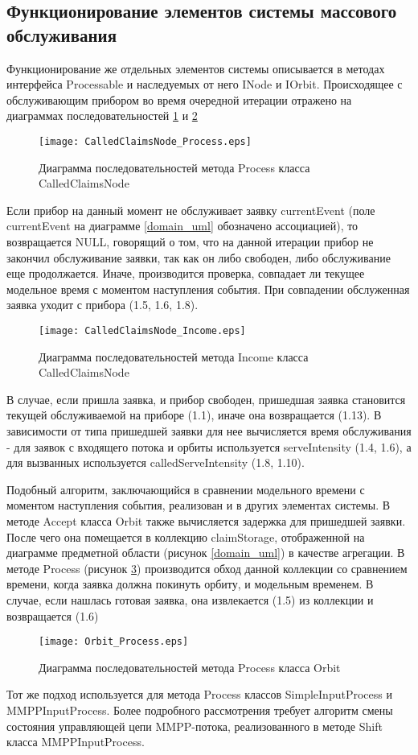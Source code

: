 \subsection{Функционирование элементов системы массового обслуживания}
Функционирование же отдельных элементов системы описывается в методах интерфейса Processable и наследуемых от него INode и IOrbit.
Происходящее с обслуживающим прибором во время очередной итерации отражено на диаграммах последовательностей \ref{CalledClaimsNode_Process_uml} и \ref{CalledClaimsNode_Income_uml}
\begin{figure}[H]
	\centering
	\texttt{[image: CalledClaimsNode\_Process.eps]}
	\caption{Диаграмма последовательностей метода Process класса CalledClaimsNode}
	\label{CalledClaimsNode_Process_uml}
\end{figure}
Если прибор на данный момент не обслуживает заявку currentEvent (поле currentEvent на диаграмме \ref{domain_uml} обозначено ассоциацией), то возвращается NULL, говорящий о том, что на данной итерации прибор не закончил обслуживание заявки, так как он либо свободен, либо обслуживание еще продолжается. Иначе, производится проверка, совпадает ли текущее модельное время с моментом наступления события. При совпадении обслуженная заявка уходит с прибора (1.5, 1.6, 1.8).
\begin{figure}[H]
	\centering
	\texttt{[image: CalledClaimsNode\_Income.eps]}
	\caption{Диаграмма последовательностей метода Income класса CalledClaimsNode}
	\label{CalledClaimsNode_Income_uml}
\end{figure}
В случае, если пришла заявка, и прибор свободен, пришедшая заявка становится текущей обслуживаемой на приборе (1.1), иначе она возвращается (1.13). В зависимости от типа пришедшей заявки для нее вычисляется время обслуживания - для заявок с входящего потока и орбиты используется serveIntensity (1.4, 1.6), а для  вызванных используется calledServeIntensity (1.8, 1.10).

Подобный алгоритм, заключающийся в сравнении модельного времени с моментом наступления события, реализован и в других элементах системы.
В методе Accept класса Orbit также вычисляется задержка для пришедшей заявки. После чего она помещается в коллекцию claimStorage, отображенной на диаграмме предметной области (рисунок \ref{domain_uml}) в качестве агрегации. В методе Process (рисунок \ref{Orbit_Process_uml}) производится обход данной коллекции со сравнением времени, когда заявка должна покинуть орбиту, и модельным временем. В случае, если нашлась готовая заявка, она извлекается (1.5) из коллекции и возвращается (1.6)
 \begin{figure}[H]
 	\centering
 	\texttt{[image: Orbit\_Process.eps]}
 	\caption{Диаграмма последовательностей метода Process класса Orbit}
 	\label{Orbit_Process_uml}
 \end{figure}
Тот же подход используется для метода Process классов SimpleInputProcess и \\ MMPPInputProcess. Более подробного рассмотрения требует алгоритм смены состояния управляющей цепи MMPP-потока, реализованного в методе Shift класса MMPPInputProcess.

